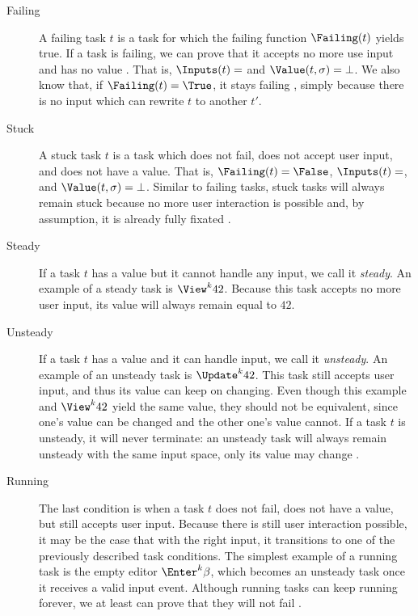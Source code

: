 \begin{description}

  \item[Failing]
    A failing task $t$ is a task for which the failing function $\Failing(t)$ yields true.
    If a task is failing, we can prove that it accepts no more use input and has no value .
    That is, $\Inputs(t) = \empty$ and $\Value(t,\sigma) = \bot$.
    We also know that, if $\Failing(t) = \True$, it stays failing ,
    simply because there is no input which can rewrite $t$ to another $t'$.

  \item[Stuck]
    A stuck task $t$ is a task which does not fail, does not accept user input, and does not have a value.
    That is, $\Failing(t) = \False$, $\Inputs(t) = \empty$, and $\Value(t,\sigma) = \bot$.
    Similar to failing tasks, stuck tasks will always remain stuck because no more user interaction is possible and, by assumption, it is already fully fixated .

  \item[Steady]
    If a task $t$ has a value but it cannot handle any input, we call it \emph{steady}.
    An example of a steady task is $\View^k 42$.
    Because this task accepts no more user input, its value will always remain equal to $42$.

  \item[Unsteady]
    If a task $t$ has a value and it can handle input, we call it \emph{unsteady}.
    An example of an unsteady task is $\Update^k 42$.
    This task still accepts user input, and thus its value can keep on changing.
    Even though this example and $\View^k 42$ yield the same value,
    they should not be equivalent, since one's value can be changed and the other one's value cannot.
    If a task $t$ is unsteady, it will never terminate: an unsteady task will always remain unsteady with the same input space, only its value may change .

  \item[Running]
    The last condition is when a task $t$ does not fail, does not have a value, but still accepts user input.
    Because there is still user interaction possible, it may be the case that with the right input, it transitions to one of the previously described task conditions.
    The simplest example of a running task is the empty editor $\Enter^k \beta$, which becomes an unsteady task once it receives a valid input event.
    Although running tasks can keep running forever,
    we at least can prove that they will not fail .

\end{description}

